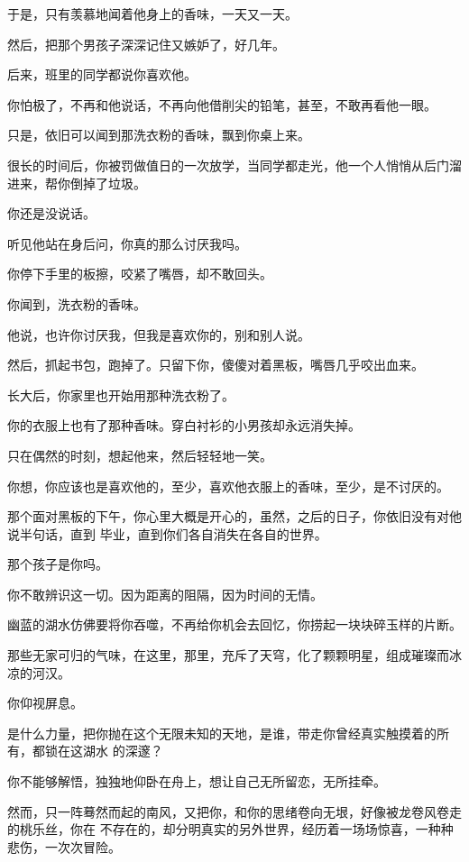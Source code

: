 \documentclass[12pt,a4paper]{article}
\def\blankrev{\vspace{1ex}}									%
\begin{document}
		于是，只有羡慕地闻着他身上的香味，一天又一天。\par
		然后，把那个男孩子深深记住又嫉妒了，好几年。


		后来，班里的同学都说你喜欢他。\par
		你怕极了，不再和他说话，不再向他借削尖的铅笔，甚至，不敢再看他一眼。\par
		只是，依旧可以闻到那洗衣粉的香味，飘到你桌上来。\par
		很长的时间后，你被罚做值日的一次放学，当同学都走光，他一个人悄悄从后门溜进来，帮你倒掉了垃圾。

		你还是没说话。\par
		听见他站在身后问，你真的那么讨厌我吗。\par
		你停下手里的板擦，咬紧了嘴唇，却不敢回头。\par
		你闻到，洗衣粉的香味。\par
		他说，也许你讨厌我，但我是喜欢你的，别和别人说。\par
		然后，抓起书包，跑掉了。只留下你，傻傻对着黑板，嘴唇几乎咬出血来。


		长大后，你家里也开始用那种洗衣粉了。\par
		你的衣服上也有了那种香味。穿白衬衫的小男孩却永远消失掉。\par
		只在偶然的时刻，想起他来，然后轻轻地一笑。\par
		你想，你应该也是喜欢他的，至少，喜欢他衣服上的香味，至少，是不讨厌的。

		那个面对黑板的下午，你心里大概是开心的，虽然，之后的日子，你依旧没有对他说半句话，直到
	毕业，直到你们各自消失在各自的世界。


		\blankrev
		那个孩子是你吗。\par
		你不敢辨识这一切。因为距离的阻隔，因为时间的无情。\par
		幽蓝的湖水仿佛要将你吞噬，不再给你机会去回忆，你捞起一块块碎玉样的片断。\par
		那些无家可归的气味，在这里，那里，充斥了天穹，化了颗颗明星，组成璀璨而冰凉的河汉。\par
		你仰视屏息。

		是什么力量，把你抛在这个无限未知的天地，是谁，带走你曾经真实触摸着的所有，都锁在这湖水
	的深邃？

		你不能够解悟，独独地仰卧在舟上，想让自己无所留恋，无所挂牵。

		然而，只一阵蓦然而起的南风，又把你，和你的思绪卷向无垠，好像被龙卷风卷走的桃乐丝，你在
	不存在的，却分明真实的另外世界，经历着一场场惊喜，一种种悲伤，一次次冒险。
\end{document}
